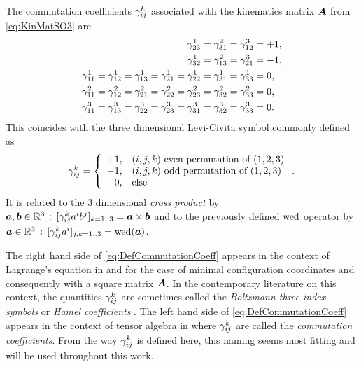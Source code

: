 \begin{Example}%
The commutation coefficients $\gamma^{k}_{ij}$ associated with the kinematics matrix $\boldsymbol{A}$ from \eqref{eq:KinMatSO3} are
\begin{align*}
 \gamma^{1}_{23} = \gamma^{2}_{31} = \gamma^{3}_{12} &= +1,
\\
 \gamma^{1}_{32} = \gamma^{2}_{13} = \gamma^{3}_{21} &= -1,
\\
 \gamma^{1}_{11} = \gamma^{1}_{12} = \gamma^{1}_{13} = \gamma^{1}_{21} = \gamma^{1}_{22} = \gamma^{1}_{31} = \gamma^{1}_{33} &= 0,
\\
 \gamma^{2}_{11} = \gamma^{2}_{12} = \gamma^{2}_{21} = \gamma^{2}_{22} = \gamma^{2}_{23} = \gamma^{2}_{32} = \gamma^{2}_{33} &= 0,
\\
 \gamma^{3}_{11} = \gamma^{3}_{13} = \gamma^{3}_{22} = \gamma^{3}_{23} = \gamma^{3}_{31} = \gamma^{3}_{32} = \gamma^{3}_{33} &= 0.
\end{align*}
This coincides with the three dimensional Levi-Civita symbol commonly defined as
\begin{align}\label{eq:BoltzmannSymSattelite}
 \BoltzSym{\LidxIII}{\LidxI}{\LidxII} =
 \left\{
 \begin{array}{rl}
  +1, & (\LidxI,\LidxII,\LidxIII) \ \text{even permutation of} \ (1,2,3) \\
  -1, & (\LidxI,\LidxII,\LidxIII) \ \text{odd permutation of} \ (1,2,3) \\
  0, & \text{else}
 \end{array}
 \right.
 .
\end{align}
It is related to the 3 dimensional \textit{cross product} by $\boldsymbol{a}, \boldsymbol{b} \in \mathbb{R}^3 \, : \, [\gamma^{k}_{ij} a^{i} b^{j}]_{k=1..3} = \boldsymbol{a} \times \boldsymbol{b}$ and to the previously defined $\operatorname{wed}$ operator by $\boldsymbol{a} \in \mathbb{R}^3 \, : \, [\gamma^{k}_{ij} a^{i}]_{j,k=1..3} = \operatorname{wed}(\boldsymbol{a})$.
\end{Example}

The right hand side of \eqref{eq:DefCommutationCoeff} appears in the context of Lagrange's equation in \cite[p.\ 687]{Boltzmann:NonholCoord} and \cite[p.\ 10]{Hamel:LagrangeEuler} for the case of minimal configuration coordinates and consequently with a square matrix $\boldsymbol{A}$.
In the contemporary literature on this context, the quantities $\gamma^{k}_{ij}$ are sometimes called the \textit{Boltzmann three-index symbols} \cite[sec.\,1.8]{Lurie:AnalyticalMechanics} or \textit{Hamel coefficients} \cite[p.\,75]{Bremer:ElasticMultibodyDynamics}.
The left hand side of \eqref{eq:DefCommutationCoeff} appears in the context of tensor algebra in \cite[Box 8.4]{Misner:Gravitation} where $\gamma^{k}_{ij}$ are called the \textit{commutation coefficients}.
From the way $\gamma^{k}_{ij}$ is defined here, this naming seems most fitting and will be used throughout this work. 

